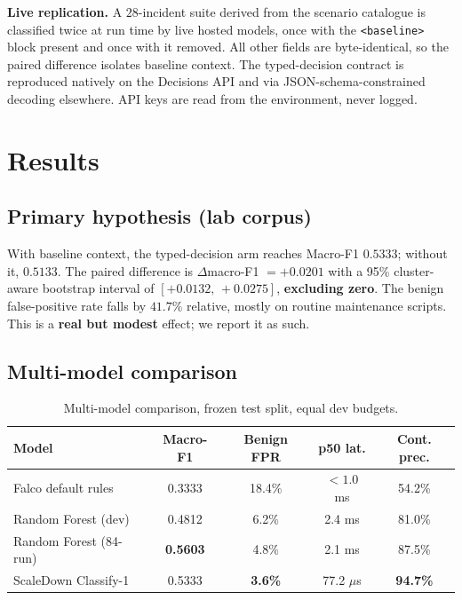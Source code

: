 \documentclass[conference]{IEEEtran}
\begin{document}
\textbf{Live replication.} A $28$-incident suite derived from the scenario catalogue is classified twice at run time by live hosted models, once with the \texttt{<baseline>} block present and once with it removed. All other fields are byte-identical, so the paired difference isolates baseline context. The typed-decision contract is reproduced natively on the Decisions API and via JSON-schema-constrained decoding elsewhere. API keys are read from the environment, never logged.

\section{Results}

\subsection{Primary hypothesis (lab corpus)}
With baseline context, the typed-decision arm reaches Macro-F1 $\mathbf{0.5333}$; without it, $0.5133$. The paired difference is $\Delta$macro-F1 $= \mathbf{+0.0201}$ with a 95\% cluster-aware bootstrap interval of $\mathbf{[+0.0132,\,+0.0275]}$, \textbf{excluding zero}. The benign false-positive rate falls by $\mathbf{41.7\%}$ relative, mostly on routine maintenance scripts. This is a \textbf{real but modest} effect; we report it as such.

\subsection{Multi-model comparison}
\begin{table}[t]
\caption{Multi-model comparison, frozen test split, equal dev budgets.}
\label{tab:models}
\centering\scriptsize
\setlength{\tabcolsep}{2.6pt}
\begin{tabular}{@{}lcccc@{}}
\toprule
Model & Macro-F1 & Benign FPR & p50 lat. & Cont. prec. \\
\midrule
Falco default rules   & 0.3333 & 18.4\% & $<1.0$ ms & 54.2\% \\
Random Forest (dev)   & 0.4812 & 6.2\%  & 2.4 ms    & 81.0\% \\
Random Forest (84-run)& \textbf{0.5603} & 4.8\%  & 2.1 ms    & 87.5\% \\
ScaleDown Classify-1  & 0.5333 & \textbf{3.6\%}  & 77.2 $\mu$s & \textbf{94.7\%} \\
\bottomrule
\end{tabular}
\end{table}
\end{document}
